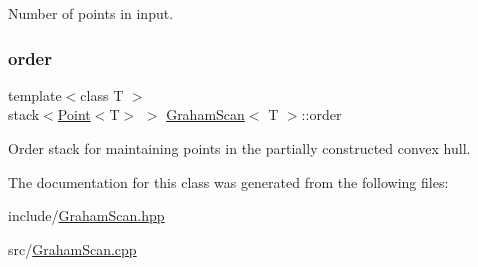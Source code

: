 Number of points in input. 

\mbox{\label{classGrahamScan_a586a222b7f2127410d9e20fda19c64d3}} 
\subsubsection{\texorpdfstring{order}{order}}
{\footnotesize\ttfamily template$<$class T $>$ \\
stack$<$\mbox{\hyperlink{classPoint}{Point}}$<$T$>$ $>$ \mbox{\hyperlink{classGrahamScan}{Graham\+Scan}}$<$ T $>$\+::order\hspace{0.3cm}{\ttfamily [private]}}



Order stack for maintaining points in the partially constructed convex hull. 



The documentation for this class was generated from the following files\+:\begin{DoxyCompactItemize}
\item 
include/\mbox{\hyperlink{GrahamScan_8hpp}{Graham\+Scan.\+hpp}}\item 
src/\mbox{\hyperlink{GrahamScan_8cpp}{Graham\+Scan.\+cpp}}\end{DoxyCompactItemize}
